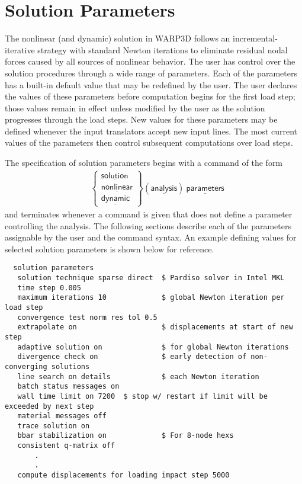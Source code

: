 \documentclass[11pt]{report}
\numberwithin{equation}{section}
\newcommand{\nin} {\noindent}
\newcommand{\ul} {\underline}
\newcommand{\hv} {\mathsf}   %
\begin{document}
\section{Solution Parameters}

\noindent
The nonlinear (and dynamic) solution in WARP3D 
follows an incremental-iterative strategy with standard Newton iterations to eliminate
residual nodal forces caused by all sources of nonlinear behavior. The user has 
control over the solution procedures through a wide range of parameters. 
Each of the parameters has a built-in default value that may be redefined by 
the user. The user declares the values of these parameters before computation begins 
for the first load step; those values remain in effect unless modified by the user as 
the solution progresses through the load steps. New values for these parameters may 
be defined whenever the input translators accept new input lines. The most current 
values of the parameters then control subsequent computations over load steps.

The specification of solution parameters begins with a command of the form
\begin{align*}
& 
\begin{Bmatrix}
\hv{\ul{solution}} \\ \hv{\ul{nonlinear}}\\ \hv{\ul{dynamic}}
\end{Bmatrix}
\hv{(\ul{analysis})\ \ul{parameters}} 
\end{align*}
\nin and terminates whenever a command is given that does not define a parameter 
controlling the analysis. The following sections describe each of the parameters 
assignable by the user and the command syntax. An example defining values 
for selected solution parameters is shown below for reference.
\small
\begin{verbatim}
  solution parameters
   solution technique sparse direct  $ Pardiso solver in Intel MKL 
   time step 0.005
   maximum iterations 10             $ global Newton iteration per load step
   convergence test norm res tol 0.5
   extrapolate on                    $ displacements at start of new step
   adaptive solution on              $ for global Newton iterations
   divergence check on               $ early detection of non-converging solutions
   line search on details            $ each Newton iteration
   batch status messages on
   wall time limit on 7200  $ stop w/ restart if limit will be exceeded by next step
   material messages off
   trace solution on
   bbar stabilization on             $ For 8-node hexs
   consistent q-matrix off
       .
       .
   compute displacements for loading impact step 5000
\end{verbatim}
\normalsize
\end{document}
